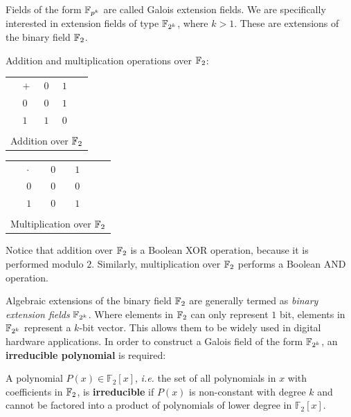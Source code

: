 Fields of the form ${\mathbb{F}}_{p^{k}}$ are called Galois extension fields.
We are specifically interested in extension fields of type 
${\mathbb{F}}_{2^k}$, where $k > 1$. These are extensions of the binary
field ${\mathbb{F}}_2$.
\begin{Example}
Addition and multiplication operations over ${\mathbb{F}}_2$:
\begin{table}[!h]
	\centering
	\begin{tabular}{m{1cm}|l|ll|m{1cm}}
	\hhline{~---~}
	\multirow{3}{*}{} & $+$ & $0$ & $1$ & \multirow{3}{*}{} \\
	\hhline{~---~}
	& $0$ & $0$ & $1$ & \\
	& $1$ & $1$ & $0$ & \\
	\hhline{~---~}
	\multicolumn{5}{c}{}\\
	\multicolumn{5}{c}{Addition over ${\mathbb{F}}_2$}\\
	\end{tabular}
	\quad
	\begin{tabular}{m{1cm}|l|ll|m{1cm}}
	\hhline{~---~}
	\multirow{3}{*}{} & $\cdot$ & $0$ & $1$ & \multirow{3}{*}{} \\
	\hhline{~---~}
	& $0$ & $0$ & $0$ & \\
	& $1$ & $0$ & $1$ & \\
	\hhline{~---~}
	\multicolumn{5}{c}{}\\
	\multicolumn{5}{c}{Multiplication over ${\mathbb{F}}_2$}\\
	\end{tabular}
\end{table}

Notice that addition over ${\mathbb{F}}_2$ is a Boolean {\sc XOR} operation, 
because it is performed modulo $2$.
Similarly, multiplication over ${\mathbb{F}}_2$ performs a Boolean {\sc AND} operation.
\end{Example}

Algebraic extensions of the binary field ${\mathbb{F}}_{2}$  
are generally termed as {\it binary extension fields} ${\mathbb{F}}_{2^k}$.
Where elements in ${\mathbb{F}}_2$ can only represent $1$ bit, elements in ${\mathbb{F}}_{2^k}$ 
represent a $k$-bit vector.
This allows them to be widely used in digital hardware applications.
In order to construct a Galois field of the form ${\mathbb{F}}_{2^k}$, 
an {\bf irreducible polynomial} is required:
\begin{Definition}
A polynomial $P(x) \in \mathbb{F}_{2}\left[x\right]$, {\it i.e.} the set of all 
polynomials in $x$ with coefficients in ${\mathbb{F}}_2$, is {\bf irreducible} 
if $P(x)$ is non-constant with degree $k$ and cannot be 
factored into a product of polynomials of lower degree in $\mathbb{F}_2[x]$.
\end{Definition}

